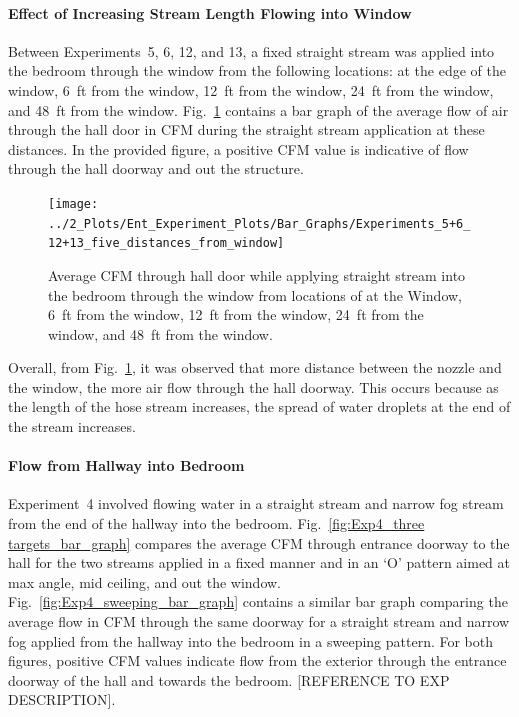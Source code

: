 \documentclass[12pt,oneside]{book}
\begin{document}
\FloatBarrier

\paragraph{Effect of Increasing Stream Length Flowing into Window} \mbox{}

Between Experiments~5, 6, 12, and 13, a fixed straight stream was applied into the bedroom through the window from the following locations: at the edge of the window, 6~ft from the window, 12~ft from the window, 24~ft from the window, and 48~ft from the window. Fig.~\ref{fig:Exps5_6_12_and_13_bar_graph} contains a bar graph of the average flow of air through the hall door in CFM during the straight stream application at these distances. In the provided figure, a positive CFM value is indicative of flow through the hall doorway and out the structure.

\begin{figure}[!ht]
	\centering
	\texttt{[image: ../2\_Plots/Ent\_Experiment\_Plots/Bar\_Graphs/Experiments\_5+6\_12+13\_five\_distances\_from\_window]}
	\caption{Average CFM through hall door while applying straight stream into the bedroom through the window from locations of at the Window, 6~ft from the window, 12~ft from the window, 24~ft from the window, and 48~ft from the window.}
	\label{fig:Exps5_6_12_and_13_bar_graph}
\end{figure}

Overall, from Fig.~\ref{fig:Exps5_6_12_and_13_bar_graph}, it was observed that more distance between the nozzle and the window, the more air flow through the hall doorway. This occurs because as the length of the hose stream increases, the spread of water droplets at the end of the stream increases. 

\FloatBarrier

\paragraph{Flow from Hallway into Bedroom} \mbox{}

Experiment~4 involved flowing water in a straight stream and narrow fog stream from the end of the hallway into the bedroom. Fig.~\ref{fig:Exp4_three targets_bar_graph} compares the average CFM through entrance doorway to the hall for the two streams applied in a fixed manner and in an `O' pattern aimed at max angle, mid ceiling, and out the window. Fig.~\ref{fig:Exp4_sweeping_bar_graph} contains a similar bar graph comparing the average flow in CFM through the same doorway for a straight stream and narrow fog applied from the hallway into the bedroom in a sweeping pattern. For both figures, positive CFM values indicate flow from the exterior through the entrance doorway of the hall and towards the bedroom. [REFERENCE TO EXP DESCRIPTION]. 
\end{document}
